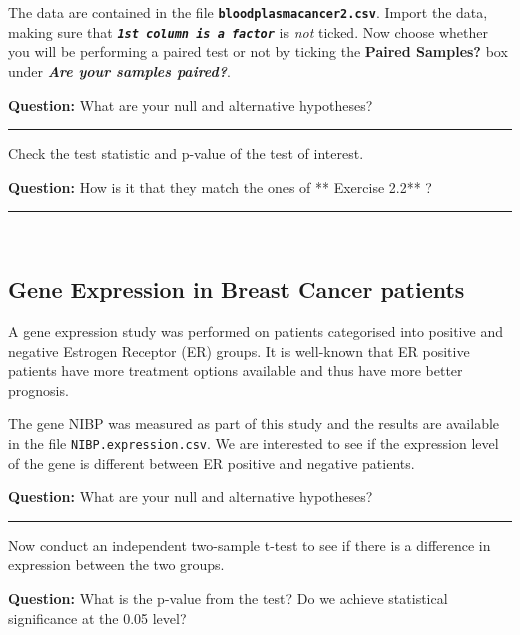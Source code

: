 \documentclass[]{article}
\begin{document}
The data are contained in the file
\textbf{\texttt{bloodplasmacancer2.csv}}. Import the data, making sure
that \textbf{\emph{\texttt{1st\ column\ is\ a\ factor}}} is \emph{not}
ticked. Now choose whether you will be performing a paired test or not
by ticking the \textbf{Paired Samples?} box under \textbf{\emph{Are your
samples paired?}}.

{\textbf{Question:}} What are your null and alternative hypotheses?

\begin{center}\rule{0.5\linewidth}{\linethickness}\end{center}

Check the test statistic and p-value of the test of interest.

{\textbf{Question:}} How is it that they match the ones of ** Exercise
2.2** ?

\begin{center}\rule{0.5\linewidth}{\linethickness}\end{center}

~

\hypertarget{gene-expression-in-breast-cancer-patients}{%
\subsection{Gene Expression in Breast Cancer
patients}\label{gene-expression-in-breast-cancer-patients}}

A gene expression study was performed on patients categorised into
positive and negative Estrogen Receptor (ER) groups. It is well-known
that ER positive patients have more treatment options available and thus
have more better prognosis.

The gene NIBP was measured as part of this study and the results are
available in the file \texttt{NIBP.expression.csv}. We are interested to
see if the expression level of the gene is different between ER positive
and negative patients.

{\textbf{Question:}} What are your null and alternative hypotheses?

\begin{center}\rule{0.5\linewidth}{\linethickness}\end{center}

Now conduct an independent two-sample t-test to see if there is a
difference in expression between the two groups.

{\textbf{Question:}} What is the p-value from the test? Do we achieve
statistical significance at the 0.05 level?
\end{document}
